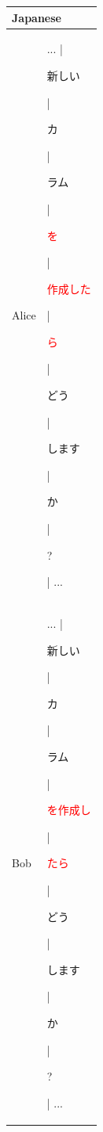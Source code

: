\documentclass[11pt]{article}
\begin{document}
\begin{table}[t]
\centering
\begin{tabular}{l|l}
\hline
\multicolumn{2}{l}{Japanese} \\
\hline
Alice & ... | \begin{CJK}{UTF8}{ipxm}新しい\end{CJK} | \begin{CJK}{UTF8}{ipxm}カ\end{CJK} | \begin{CJK}{UTF8}{ipxm}ラム\end{CJK} | \begin{CJK}{UTF8}{ipxm}\textcolor{red}{を}\end{CJK} | \begin{CJK}{UTF8}{ipxm}\textcolor{red}{作成した}\end{CJK} | \begin{CJK}{UTF8}{ipxm}\textcolor{red}{ら}\end{CJK} | \begin{CJK}{UTF8}{ipxm}どう\end{CJK} | \begin{CJK}{UTF8}{ipxm}します\end{CJK} | \begin{CJK}{UTF8}{ipxm}か\end{CJK} | \begin{CJK}{UTF8}{ipxm}?\end{CJK} | ... \\
Bob & ... | \begin{CJK}{UTF8}{ipxm}新しい\end{CJK} | \begin{CJK}{UTF8}{ipxm}カ\end{CJK} | \begin{CJK}{UTF8}{ipxm}ラム\end{CJK} | \begin{CJK}{UTF8}{ipxm}\textcolor{red}{を作成し}\end{CJK} | \begin{CJK}{UTF8}{ipxm}\textcolor{red}{たら}\end{CJK} | \begin{CJK}{UTF8}{ipxm}どう\end{CJK} | \begin{CJK}{UTF8}{ipxm}します\end{CJK} | \begin{CJK}{UTF8}{ipxm}か\end{CJK} | \begin{CJK}{UTF8}{ipxm}?\end{CJK} | ... \\

\end{tabular}
\end{table}
\end{document}
